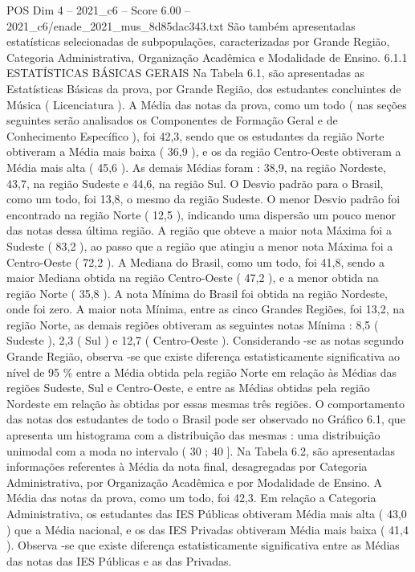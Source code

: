 \begin{textsample}{POS Dim 4 – 2021\_c6 – Score 6.00 – 2021\_c6/enade\_2021\_mus\_8d85dac343.txt}
São também apresentadas estatísticas selecionadas de subpopulações, caracterizadas por Grande Região, Categoria Administrativa, Organização Acadêmica e Modalidade de Ensino. 6.1.1 ESTATÍSTICAS BÁSICAS GERAIS Na Tabela 6.1, são apresentadas as Estatísticas Básicas da prova, por Grande Região, dos estudantes concluintes de Música ( Licenciatura ).
A Média das notas da prova, como um todo ( nas seções seguintes serão analisados os Componentes de Formação Geral e de Conhecimento Específico ), foi 42,3, sendo que os estudantes da região Norte obtiveram a Média mais baixa ( 36,9 ), e os da região Centro-Oeste obtiveram a Média mais alta ( 45,6 ).
As demais Médias foram : 38,9, na região Nordeste, 43,7, na região Sudeste e 44,6, na região Sul.
O Desvio padrão para o Brasil, como um todo, foi 13,8, o mesmo da região Sudeste.
O menor Desvio padrão foi encontrado na região Norte ( 12,5 ), indicando uma dispersão um pouco menor das notas dessa última região.
A região que obteve a maior nota Máxima foi a Sudeste ( 83,2 ), ao passo que a região que atingiu a menor nota Máxima foi a Centro-Oeste ( 72,2 ).
A Mediana do Brasil, como um todo, foi 41,8, sendo a maior Mediana obtida na região Centro-Oeste ( 47,2 ), e a menor obtida na região Norte ( 35,8 ).
A nota Mínima do Brasil foi obtida na região Nordeste, onde foi zero.
A maior nota Mínima, entre as cinco Grandes Regiões, foi 13,2, na região Norte, as demais regiões obtiveram as seguintes notas Mínima : 8,5 ( Sudeste ), 2,3 ( Sul ) e 12,7 ( Centro-Oeste ).
Considerando -se as notas segundo Grande Região, observa -se que existe diferença estatisticamente significativa ao nível de 95 \% entre a Média obtida pela região Norte em relação às Médias das regiões Sudeste, Sul e Centro-Oeste, e entre as Médias obtidas pela região Nordeste em relação às obtidas por essas mesmas três regiões.
O comportamento das notas dos estudantes de todo o Brasil pode ser observado no Gráfico 6.1, que apresenta um histograma com a distribuição das mesmas : uma distribuição unimodal com a moda no intervalo ( 30 ; 40 ].
Na Tabela 6.2, são apresentadas informações referentes à Média da nota final, desagregadas por Categoria Administrativa, por Organização Acadêmica e por Modalidade de Ensino.
A Média das notas da prova, como um todo, foi 42,3.
Em relação a Categoria Administrativa, os estudantes das IES Públicas obtiveram Média mais alta ( 43,0 ) que a Média nacional, e os das IES Privadas obtiveram Média mais baixa ( 41,4 ).
Observa -se que existe diferença estatisticamente significativa entre as Médias das notas das IES Públicas e as das Privadas.

\end{textsample}

